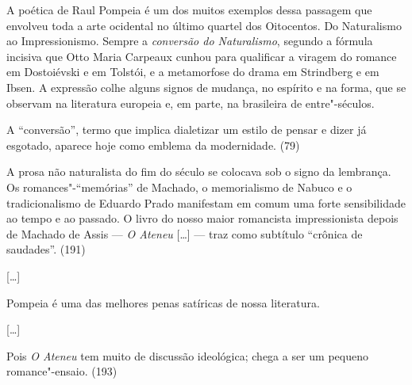 

A poética de Raul Pompeia é um dos muitos exemplos dessa
passagem que envolveu toda a arte ocidental no último quartel dos
Oitocentos. Do Naturalismo ao Impressionismo. Sempre a
\textit{conversão do Naturalismo}, segundo a
fórmula incisiva que Otto Maria Carpeaux cunhou para qualificar a
viragem do romance em Dostoiévski e em Tolstói, e a metamorfose do
drama em Strindberg e em Ibsen. A expressão colhe alguns signos de
mudança, no espírito e na forma, que se observam na literatura europeia
e, em parte, na brasileira de entre"-séculos.

A ``conversão'', termo que implica dialetizar um estilo de pensar e dizer
já esgotado, aparece hoje como emblema da modernidade. (79)



A prosa não naturalista do fim do século se colocava
sob o signo da lembrança. Os romances"-``memórias'' de Machado, o
memorialismo de Nabuco e o tradicionalismo de Eduardo Prado manifestam
em comum uma forte sensibilidade ao tempo e ao passado. O livro do
nosso maior romancista impressionista depois de Machado de Assis --- 
\textit{O Ateneu} [\ldots] --- traz como subtítulo ``crônica de saudades''. (191)

[\ldots]

Pompeia é uma das melhores penas satíricas de nossa literatura.

[\ldots]

Pois \textit{O Ateneu} tem muito de discussão ideológica; 
chega a ser um pequeno romance"-ensaio.
(193) 



